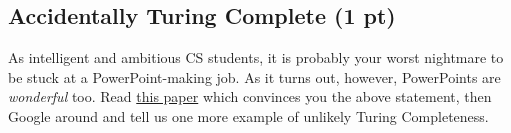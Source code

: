 \documentclass[letterpaper,11pt,twoside]{article}
\theoremstyle{plain}
\theoremstyle{definition}
\theoremstyle{remark}
\theoremstyle{restate}
\newcommand{\blue}[1]{{{\color{blue}#1}}}
\newcommand{\blue}[1]{{{#1}}}
\begin{document}
\subsection{Accidentally Turing Complete (1 pt)}
As intelligent and ambitious CS students, it is probably your worst nightmare to be stuck at a PowerPoint-making job. As it turns out, however, PowerPoints are \textit{wonderful} too. Read \href{https://www.andrew.cmu.edu/user/twildenh/PowerPointTM/Paper.pdf}{this paper} which convinces you the above statement, then Google around and tell us one more example of unlikely Turing Completeness.\\

\blue{
    
}   
\end{document}
